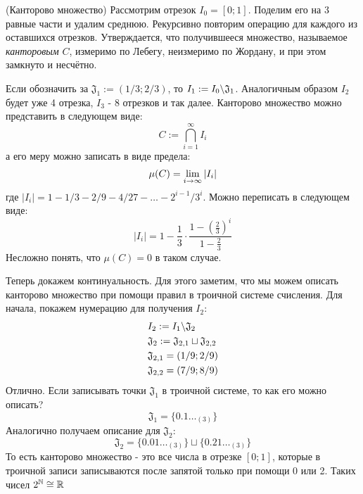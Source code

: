 \begin{example} (Канторово множество)
	Рассмотрим отрезок $I_0 = [0; 1]$. Поделим его на 3 равные части и удалим среднюю. Рекурсивно повторим операцию для каждого из оставшихся отрезков. Утверждается, что получившееся множество, называемое \textit{канторовым} $C$, измеримо по Лебегу, неизмеримо по Жордану, и при этом замкнуто и несчётно.
	
	Если обозначить за $\mathfrak{J}_1 := (1/3; 2/3)$, то $I_1 := I_0 \backslash \mathfrak{J}_1$. Аналогичным образом $I_2$ будет уже 4 отрезка, $I_3$ - 8 отрезков и так далее. Канторово множество можно представить в следующем виде:
	\[
		C := \bigcap_{i = 1}^\infty I_i
	\]
	а его меру можно записать в виде предела:
	\[
		\mu(C) = \lim\limits_{i \to \infty} |I_i|
	\]
	где $|I_i| = 1 - 1/3 - 2/9 - 4/27 - \ldots - 2^{i - 1} / 3^i$. Можно переписать в следующем виде:
	\[
		|I_i| = 1 - \frac{1}{3} \cdot \frac{1 - \left(\frac{2}{3}\right)^i}{1 - \frac{2}{3}}
	\]
	Несложно понять, что $\mu(C)  = 0$ в таком случае.
	
	Теперь докажем континуальность. Для этого заметим, что мы можем описать канторово множество при помощи правил в троичной системе счисления. Для начала, покажем нумерацию для получения $I_2$:
	\begin{align*}
		&{I_2 := I_1 \backslash \mathfrak{J}_2}
		\\
		&{\mathfrak{J}_2 := \mathfrak{J}_{2, 1} \sqcup \mathfrak{J}_{2, 2}}
		\\
		&{\mathfrak{J}_{2, 1} = (1/9; 2/9)}
		\\
		&{\mathfrak{J}_{2, 2} = (7/9; 8/9)}
	\end{align*}
	Отлично. Если записывать точки $\mathfrak{J}_1$ в троичной системе, то как его можно описать?
	\[
		\mathfrak{J}_1 = \{0.1\ldots_{(3)}\}
	\]
	Аналогично получаем описание для $\mathfrak{J}_2$:
	\[
		\mathfrak{J}_2 = \{0.01\ldots_{(3)}\} \sqcup \{0.21\ldots_{(3)}\}
	\]
	То есть канторово множество - это все числа в отрезке $[0; 1]$, которые в троичной записи записываются после запятой только при помощи 0 или 2. Таких чисел $2^{\mathbb{N}} \cong \mathbb{R}$
\end{example}